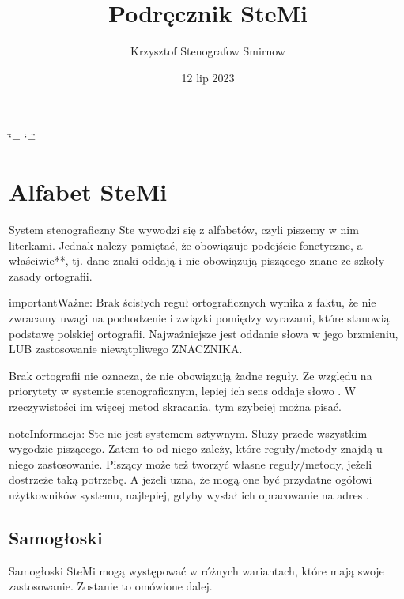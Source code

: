 \documentclass[letterpaper,10pt,polish]{sphinxmanual}
\title{Podręcznik SteMi}
\date{12 lip 2023}
\author{Krzysztof Stenografow Smirnow}
\begin{document}
\ifdefined\shorthandoff
  \ifnum\catcode`\=\string=\active\shorthandoff{=}\fi
  \ifnum\catcode`\"=\active{}\fi
\fi

\pagestyle{empty}
\sphinxmaketitle
\pagestyle{plain}
\sphinxtableofcontents
\pagestyle{normal}
\label{\detokenize{index::doc}}


\sphinxstepscope


\chapter{Alfabet SteMi}
\label{\detokenize{alfabet-stemi:alfabet-stemi}}\label{\detokenize{alfabet-stemi::doc}}
\sphinxAtStartPar
System stenograficzny Ste wywodzi się z alfabetów, czyli piszemy w nim literkami. Jednak należy pamiętać, że obowiązuje podejście fonetyczne, a właściwie**, tj. dane znaki oddają  i nie obowiązują piszącego znane ze szkoły zasady ortografii.

\begin{sphinxadmonition}{important}{Ważne:}
\sphinxAtStartPar
Brak ścisłych reguł ortograficznych wynika z faktu, że nie zwracamy uwagi na pochodzenie i związki pomiędzy wyrazami, które stanowią podstawę polskiej ortografii. Najważniejsze jest oddanie słowa w jego brzmieniu, LUB zastosowanie niewątpliwego ZNACZNIKA.
\end{sphinxadmonition}

\sphinxAtStartPar
Brak ortografii nie oznacza, że nie obowiązują żadne reguły. Ze względu na priorytety w systemie stenograficznym, lepiej ich sens oddaje słowo . W rzeczywistości im więcej metod skracania, tym szybciej można pisać.

\begin{sphinxadmonition}{note}{Informacja:}
\sphinxAtStartPar
Ste nie jest systemem sztywnym. Służy przede wszystkim wygodzie piszącego. Zatem to od niego zależy, które reguły/metody znajdą u niego zastosowanie. Piszący może też tworzyć własne reguły/metody, jeżeli dostrzeże taką potrzebę. A jeżeli uzna, że mogą one być przydatne ogółowi użytkowników systemu, najlepiej, gdyby wysłał ich opracowanie na adres .
\end{sphinxadmonition}


\section{Samogłoski}
\label{\detokenize{alfabet-stemi:samogloski}}
\sphinxAtStartPar
Samogłoski SteMi mogą występować w różnych wariantach, które mają swoje zastosowanie. Zostanie to omówione dalej.
\end{document}
